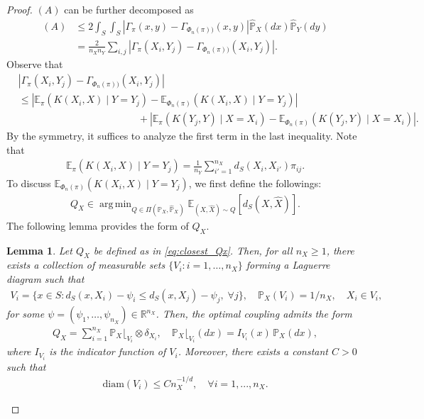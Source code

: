 \documentclass{article}
\newtheorem{lemma}{Lemma}
\DeclareMathOperator*{\argmin}{arg\,min}
\begin{document}
\begin{proof}
	$(A)$ can be further decomposed as
	\begin{align*}
		(A) &\leq 2\int_S\int_S \left\vert \Gamma_{\pi}(x,y) - \Gamma_{\Phi_n(\pi))}(x,y) \right\vert \hat{\mathbb{P}}_X(dx)\hat{\mathbb{P}}_Y(dy) \\
			&= \frac{2}{n_Xn_Y} \sum_{i,j} \left\vert \Gamma_{\pi}(X_i,Y_j) - \Gamma_{\Phi_n(\pi))}(X_i,Y_j) \right\vert .
	\end{align*}
	Observe that
	\begin{align*}
		&\left\vert \Gamma_{\pi}(X_i,Y_j) - \Gamma_{\Phi_n(\pi))}(X_i,Y_j) \right\vert \\
		&\leq \left\vert \mathbb{E}_{\pi}(K(X_i,X) \mid Y=Y_j) - \mathbb{E}_{\Phi_n(\pi)}(K(X_i,X) \mid Y=Y_j) \right\vert \\
		&\qquad\qquad\qquad\qquad\qquad\qquad + \left\vert \mathbb{E}_{\pi}(K(Y_j,Y) \mid X=X_i) - \mathbb{E}_{\Phi_n(\pi)}(K(Y_j,Y) \mid X=X_i) \right\vert .
	\end{align*}
	By the symmetry, it suffices to analyze the first term in the last inequality. Note that
	\begin{align*}
		\mathbb{E}_{\pi}(K(X_i,X) \mid Y=Y_j) = \frac{1}{n_Y} \sum_{i' = 1}^{n_X} d_S(X_i,X_{i'}) \pi_{ij} .
	\end{align*}
	To discuss $\mathbb{E}_{\Phi_n(\pi)}(K(X_i,X) \mid Y=Y_j)$, we first define the followings:
	\begin{align}
		\label{eq:closest_Qx}
		Q_X \in \argmin_{Q \in \Pi(\mathbb{P}_X,\hat{\mathbb{P}}_X)} \mathbb{E}_{(X,\hat{X}) \sim Q}\left[d_S(X,\hat{X})\right] . %
	\end{align}
	The following lemma provides the form of $Q_X$.
	\begin{lemma}
		Let $Q_X$ be defined as in \eqref{eq:closest_Qx}. 
		Then, for all $n_X \ge 1$, there exists a collection of measurable sets 
		$\{V_i : i = 1,\dots,n_X\}$ forming a Laguerre diagram such that
		\begin{align*}
			V_i = \{x \in S : d_S(x,X_i) - \psi_i \le d_S(x,X_j) - \psi_j,\;\forall j\} , \quad \mathbb{P}_X(V_i) = 1/n_X, \quad X_i \in V_i,
		\end{align*}
		for some $\psi = (\psi_1,\dots,\psi_{n_X}) \in \mathbb{R}^{n_X}$.
		Then, the optimal coupling admits the form
		\begin{align*}
		Q_X = \sum_{i=1}^{n_X} \mathbb{P}_X\lfloor_{V_i} \otimes \delta_{X_i},
		\quad 
		\mathbb{P}_X\lfloor_{V_i}(dx) = I_{V_i}(x)\,\mathbb{P}_X(dx),
		\end{align*}
		where $I_{V_i}$ is the indicator function of $V_i$. Moreover, there exists a constant $C > 0$ such that
		\begin{align*}
			\mathrm{diam}(V_i) \leq C n_X^{-1/d} , \quad \forall i = 1,...,n_X .
		\end{align*}
	\end{lemma}
\end{proof}
\end{document}
